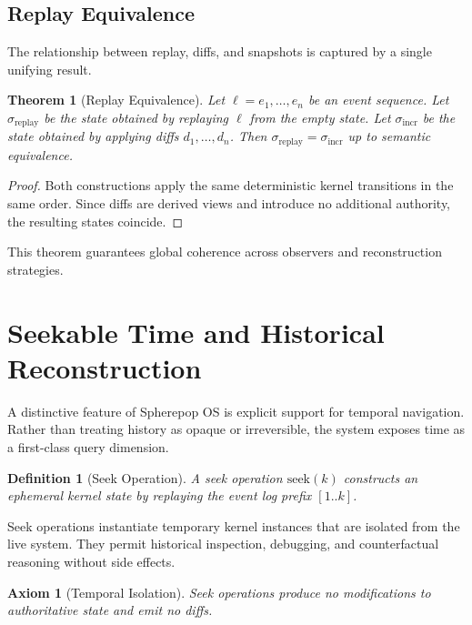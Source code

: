 \documentclass[11pt]{article}
\newtheorem{definition}{Definition}[section]
\newtheorem{axiom}{Axiom}[section]
\newtheorem{theorem}{Theorem}[section]
\begin{document}
\subsection{Replay Equivalence}

The relationship between replay, diffs, and snapshots is captured by a
single unifying result.

\begin{theorem}[Replay Equivalence]
Let $\ell = e_1,\dots,e_n$ be an event sequence. Let $\sigma_{\mathrm{replay}}$
be the state obtained by replaying $\ell$ from the empty state. Let
$\sigma_{\mathrm{incr}}$ be the state obtained by applying diffs
$d_1,\dots,d_n$. Then $\sigma_{\mathrm{replay}} = \sigma_{\mathrm{incr}}$ up
to semantic equivalence.
\end{theorem}

\begin{proof}
Both constructions apply the same deterministic kernel transitions in the
same order. Since diffs are derived views and introduce no additional
authority, the resulting states coincide.
\end{proof}

This theorem guarantees global coherence across observers and reconstruction
strategies.

\section{Seekable Time and Historical Reconstruction}

A distinctive feature of Spherepop OS is explicit support for temporal
navigation. Rather than treating history as opaque or irreversible, the
system exposes time as a first-class query dimension.

\begin{definition}[Seek Operation]
A seek operation $\mathrm{seek}(k)$ constructs an ephemeral kernel state by
replaying the event log prefix $[1..k]$.
\end{definition}

Seek operations instantiate temporary kernel instances that are isolated
from the live system. They permit historical inspection, debugging, and
counterfactual reasoning without side effects.

\begin{axiom}[Temporal Isolation]
Seek operations produce no modifications to authoritative state and emit no
diffs.
\end{axiom}
\end{document}
